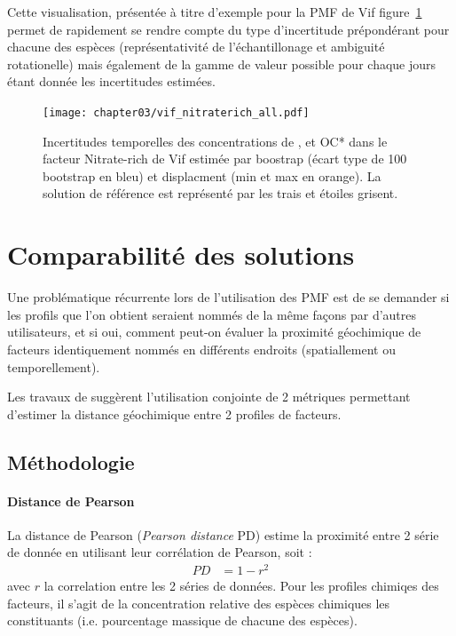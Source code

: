 Cette visualisation, présentée à titre d'exemple pour la PMF de Vif
figure~\ref{fig:chapter03/vif_nitraterich_all} permet de rapidement se rendre compte du
type d'incertitude prépondérant pour chacune des espèces (représentativité de
l'échantillonage et ambiguité rotationelle) mais également de la gamme de valeur possible
pour chaque jours étant donnée les incertitudes estimées.

\begin{figure}[ht]
    \centering
    \texttt{[image: chapter03/vif\_nitraterich\_all.pdf]}
    \caption{Incertitudes temporelles des concentrations de \PMdix, \NOt et OC* dans le
    facteur Nitrate-rich de Vif estimée par boostrap (écart type de 100 bootstrap en bleu)
et displacment (min et max en orange). La solution de référence est représenté par les
trais et étoiles grisent.}%
    \label{fig:chapter03/vif_nitraterich_all}
\end{figure}


\section{Comparabilité des solutions}%
\label{sub:comparabilité_des_solutions}

Une problématique récurrente lors de l'utilisation des PMF est de se demander si les
profils que l'on obtient seraient nommés de la même façons par d'autres utilisateurs, et
si oui, comment peut-on évaluer la proximité géochimique de facteurs identiquement nommés
en différents endroits (spatiallement ou temporellement).

Les travaux de \cite{belisNew2015a} suggèrent l'utilisation conjointe de 2
métriques permettant d'estimer la distance géochimique entre 2 profiles de facteurs.

\subsection{Méthodologie}%
\label{sub:méthodologie}

\paragraph{Distance de Pearson}%
\label{par:distance_de_pearson}

La distance de Pearson (\textit{Pearson distance} PD) estime la proximité entre 2 série de
donnée en utilisant leur corrélation de Pearson, soit :
\begin{align}
    \label{eq:PD}
    PD &= 1 - r^2
\end{align}
avec $r$ la correlation entre les 2 séries de données. Pour les profiles chimiqes des
facteurs, il s'agit de la concentration relative des espèces chimiques les constituants
(i.e. pourcentage massique de chacune des espèces).

